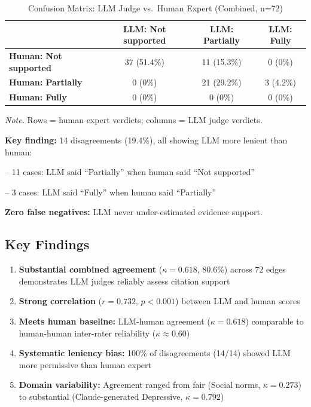 \begin{table}[H]
\centering
\caption{Confusion Matrix: LLM Judge vs.\ Human Expert (Combined, n=72)}
\label{tab:human_validation_confusion}
\begin{threeparttable}
\begin{tabular}{lccc}
\toprule
 & \textbf{LLM: Not supported} & \textbf{LLM: Partially} & \textbf{LLM: Fully} \\
\midrule
\textbf{Human: Not supported} & 37 (51.4\%) & 11 (15.3\%) & 0 (0\%) \\
\textbf{Human: Partially} & 0 (0\%) & 21 (29.2\%) & 3 (4.2\%) \\
\textbf{Human: Fully} & 0 (0\%) & 0 (0\%) & 0 (0\%) \\
\bottomrule
\end{tabular}
\begin{tablenotes}
\small
\item \textit{Note.} Rows = human expert verdicts; columns = LLM judge verdicts.
\item \textbf{Key finding:} 14 disagreements (19.4\%), all showing LLM more lenient than human:
\item \quad -- 11 cases: LLM said ``Partially'' when human said ``Not supported''
\item \quad -- 3 cases: LLM said ``Fully'' when human said ``Partially''
\item \textbf{Zero false negatives:} LLM never under-estimated evidence support.
\end{tablenotes}
\end{threeparttable}
\end{table}

\subsection{Key Findings}

\begin{enumerate}[noitemsep]
    \item \textbf{Substantial combined agreement} ($\kappa=0.618$, 80.6\%) across 72 edges demonstrates LLM judges reliably assess citation support
    \item \textbf{Strong correlation} ($r=0.732$, $p<0.001$) between LLM and human scores
    \item \textbf{Meets human baseline:} LLM-human agreement ($\kappa=0.618$) comparable to human-human inter-rater reliability ($\kappa \approx 0.60$)
    \item \textbf{Systematic leniency bias:} 100\% of disagreements (14/14) showed LLM more permissive than human expert
    \item \textbf{Domain variability:} Agreement ranged from fair (Social norms, $\kappa=0.273$) to substantial (Claude-generated Depressive, $\kappa=0.792$)
\end{enumerate}


